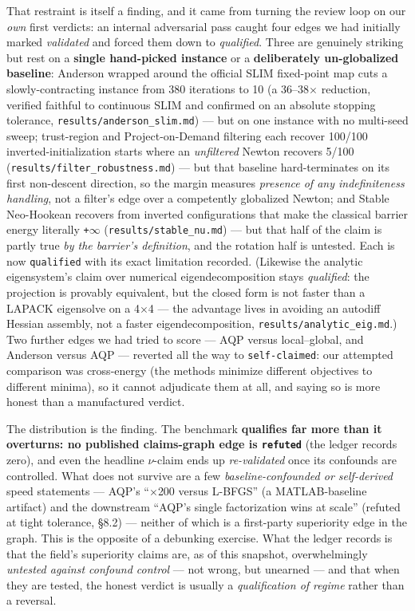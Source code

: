\documentclass{egpubl}
\begin{document}
That restraint is itself a finding, and it came from turning the review loop on our \emph{own} first
verdicts: an internal adversarial pass caught four edges we had initially marked \emph{validated} and
forced them down to \emph{qualified}. Three are genuinely striking but rest on a \textbf{single hand-picked
instance} or a \textbf{deliberately un-globalized baseline}: Anderson wrapped around the official SLIM
fixed-point map cuts a slowly-contracting instance from 380 iterations to 10 (a 36--38$\times$ reduction,
verified faithful to continuous SLIM and confirmed on an absolute stopping tolerance,
\texttt{results/anderson\_slim.md}) --- but on one instance with no multi-seed sweep; trust-region and
Project-on-Demand filtering each recover 100/100 inverted-initialization starts where an \emph{unfiltered}
Newton recovers 5/100 (\texttt{results/filter\_robustness.md}) --- but that baseline hard-terminates on its
first non-descent direction, so the margin measures \emph{presence of any indefiniteness handling}, not a
filter's edge over a competently globalized Newton; and Stable Neo-Hookean recovers from inverted
configurations that make the classical barrier energy literally \texttt{+$\infty$} (\texttt{results/stable\_nu.md}) --- but
that half of the claim is partly true \emph{by the barrier's definition}, and the rotation half is
untested. Each is now \texttt{qualified} with its exact limitation recorded. (Likewise the analytic
eigensystem's claim over numerical eigendecomposition stays \emph{qualified}: the projection is provably
equivalent, but the closed form is not faster than a LAPACK eigensolve on a 4$\times$4 --- the advantage lives
in avoiding an autodiff Hessian assembly, not a faster eigendecomposition, \texttt{results/analytic\_eig.md}.)
Two further edges we had tried to score --- AQP versus local--global, and Anderson versus AQP --- reverted
all the way to \texttt{self-claimed}: our attempted comparison was cross-energy (the methods minimize
different objectives to different minima), so it cannot adjudicate them at all, and saying so is more
honest than a manufactured verdict.

The distribution is the finding. The benchmark \textbf{qualifies far more than it overturns: no published
claims-graph edge is \texttt{refuted}} (the ledger records zero), and even the headline \texttt{$\nu$}-claim ends up
\emph{re-validated} once its confounds are controlled. What does not survive are a few \emph{baseline-confounded
or self-derived} speed statements --- AQP's ``$\times$200 versus L-BFGS'' (a MATLAB-baseline artifact) and the
downstream ``AQP's single factorization wins at scale'' (refuted at tight tolerance, \S8.2) --- neither of
which is a first-party superiority edge in the graph. This is the opposite of a debunking exercise. What the ledger records is that
the field's superiority claims are, as of this snapshot, overwhelmingly \emph{untested against confound
control} --- not wrong, but unearned --- and that when they are tested, the honest verdict is usually a
\emph{qualification of regime} rather than a reversal.
\end{document}
